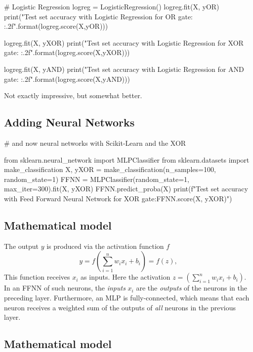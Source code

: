 \documentclass[%
oneside,                 %
final,                   %
10pt]{article}
\begin{document}
# Logistic Regression
logreg = LogisticRegression()
logreg.fit(X, yOR)
print("Test set accuracy with Logistic Regression for OR gate: {:.2f}".format(logreg.score(X,yOR)))

logreg.fit(X, yXOR)
print("Test set accuracy with Logistic Regression for XOR gate: {:.2f}".format(logreg.score(X,yXOR)))


logreg.fit(X, yAND)
print("Test set accuracy with Logistic Regression for AND gate: {:.2f}".format(logreg.score(X,yAND)))

\epycod


Not exactly impressive, but somewhat better.

\subsection{Adding Neural Networks}












\bpycod

# and now neural networks with Scikit-Learn and the XOR

from sklearn.neural_network import MLPClassifier
from sklearn.datasets import make_classification
X, yXOR = make_classification(n_samples=100, random_state=1)
FFNN = MLPClassifier(random_state=1, max_iter=300).fit(X, yXOR)
FFNN.predict_proba(X)
print(f"Test set accuracy with Feed Forward Neural Network  for XOR gate:{FFNN.score(X, yXOR)}")


\epycod


\subsection{Mathematical model}

The output $y$ is produced via the activation function $f$
\[
 y = f\left(\sum_{i=1}^n w_ix_i + b_i\right) = f(z),
\]
This function receives $x_i$ as inputs.
Here the activation $z=(\sum_{i=1}^n w_ix_i+b_i)$. 
In an FFNN of such neurons, the \emph{inputs} $x_i$ are the \emph{outputs} of
the neurons in the preceding layer. Furthermore, an MLP is
fully-connected, which means that each neuron receives a weighted sum
of the outputs of \emph{all} neurons in the previous layer.

\subsection{Mathematical model}
\end{document}
